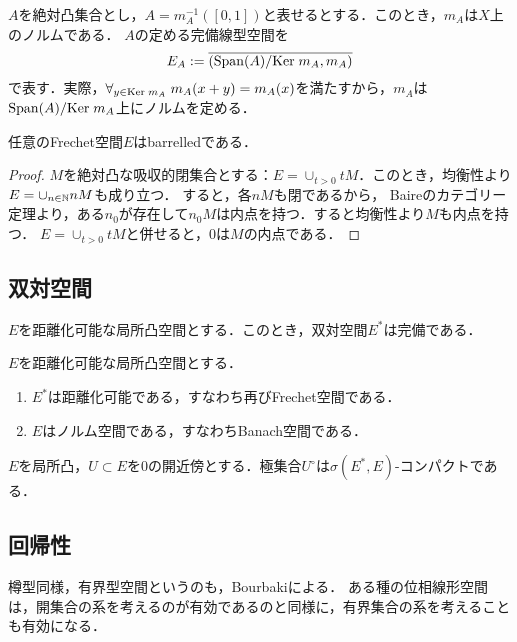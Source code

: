 \documentclass[uplatex,dvipdfmx]{jsreport}
\begin{document}
\begin{notation}
    $A$を絶対凸集合とし，$A=m_A^{-1}([0,1])$と表せるとする．このとき，$m_A$は$X$上のノルムである．
    $A$の定める完備線型空間を
    \[E_A:=\overline{\left(\mathrm{Span}(A)/\mathrm{Ker}\; m_A,m_A\right)}\]
    で表す．実際，$\forall_{y\in\mathrm{Ker}\; m_A}\;m_A(x+y)=m_A(x)$を満たすから，$m_A$は$\mathrm{Span}(A)/\mathrm{Ker}\; m_A$上にノルムを定める．
\end{notation}

\begin{proposition}
    任意のFrechet空間$E$はbarrelledである．
\end{proposition}
\begin{proof}
    $M$を絶対凸な吸収的閉集合とする：$E=\cup_{t>0}tM$．このとき，均衡性より$E=\cup_{n\in\mathbb{N}}nM$も成り立つ．
    すると，各$nM$も閉であるから，
    Baireのカテゴリー定理より，ある$n_0$が存在して$n_0M$は内点を持つ．すると均衡性より$M$も内点を持つ．
    $E=\cup_{t>0}tM$と併せると，$0$は$M$の内点である．
\end{proof}

\subsection{双対空間}

\begin{theorem}
    $E$を距離化可能な局所凸空間とする．このとき，双対空間$E^*$は完備である．
\end{theorem}

\begin{corollary}
    $E$を距離化可能な局所凸空間とする．
    \begin{enumerate}
        \item $E^*$は距離化可能である，すなわち再びFrechet空間である．
        \item $E$はノルム空間である，すなわちBanach空間である．
    \end{enumerate}
\end{corollary}

\begin{theorem}
    $E$を局所凸，$U\subset E$を$0$の開近傍とする．極集合$U^\circ$は$\sigma(E^*,E)$-コンパクトである．
\end{theorem}

\subsection{回帰性}

\begin{tcolorbox}[colframe=ForestGreen, colback=ForestGreen!10!white,breakable,colbacktitle=ForestGreen!40!white,coltitle=black,fonttitle=\bfseries\sffamily,
title=]
    樽型同様，有界型空間というのも，Bourbakiによる．
    ある種の位相線形空間は，開集合の系を考えるのが有効であるのと同様に，有界集合の系を考えることも有効になる．
\end{tcolorbox}
\end{document}
